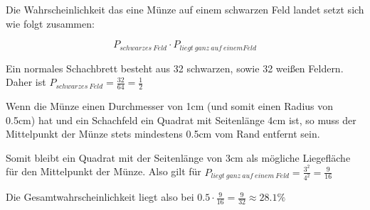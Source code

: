 Die Wahrscheinlichkeit das eine Münze auf einem schwarzen Feld landet setzt sich wie folgt zusammen:

\[ P_{schwarzes~Feld} \cdot P_{liegt~ganz~auf~einem Feld} \]

Ein normales Schachbrett besteht aus 32 schwarzen, sowie 32 weißen Feldern. Daher ist \(P_{schwarzes~Feld}=\frac{32}{64}=\frac{1}{2}\) 

Wenn die Münze einen Durchmesser von 1cm (und somit einen Radius von 0.5cm) hat und ein Schachfeld ein Quadrat mit Seitenlänge 4cm ist, so muss der Mittelpunkt der Münze stets mindestens 0.5cm vom Rand entfernt sein.

Somit bleibt ein Quadrat mit der Seitenlänge von 3cm als mögliche Liegefläche für den Mittelpunkt der Münze. Also gilt für \( P_{liegt~ganz~auf~einem~Feld} = \frac{3^2}{4^2} = \frac{9}{16} \)

Die Gesamtwahrscheinlichkeit liegt also bei \( 0.5 \cdot \frac{9}{16} = \frac{9}{32} \approx 28.1\% \)


